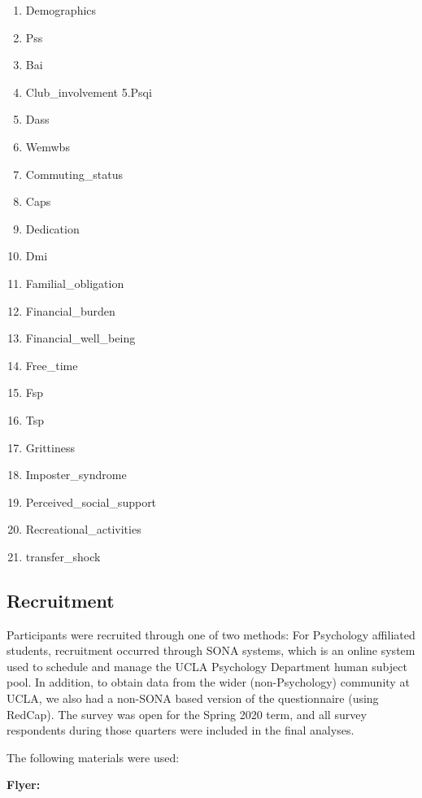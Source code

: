 \documentclass[]{book}
\providecommand{\tightlist}{%
  \setlength{\itemsep}{0pt}\setlength{\parskip}{0pt}}
\begin{document}
\begin{enumerate}
\def\labelenumi{\arabic{enumi}.}
\tightlist
\item
  Demographics
\item
  Pss
\item
  Bai
\item
  Club\_involvement
  5.Psqi
\item
  Dass
\item
  Wemwbs
\item
  Commuting\_status
\item
  Caps
\item
  Dedication
\item
  Dmi
\item
  Familial\_obligation
\item
  Financial\_burden
\item
  Financial\_well\_being
\item
  Free\_time
\item
  Fsp
\item
  Tsp
\item
  Grittiness
\item
  Imposter\_syndrome
\item
  Perceived\_social\_support
\item
  Recreational\_activities
\item
  transfer\_shock
\end{enumerate}

\hypertarget{recruitment}{%
\subsection{Recruitment}\label{recruitment}}

Participants were recruited through one of two methods: For Psychology affiliated students, recruitment occurred through SONA systems, which is an online system used to schedule and manage the UCLA Psychology Department human subject pool. In addition, to obtain data from the wider (non-Psychology) community at UCLA, we also had a non-SONA based version of the questionnaire (using RedCap). The survey was open for the Spring 2020 term, and all survey respondents during those quarters were included in the final analyses.

The following materials were used:

\textbf{Flyer:}
\end{document}
